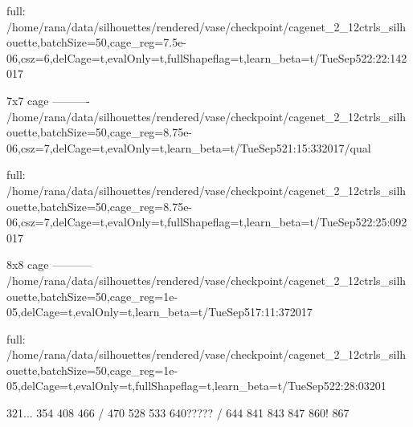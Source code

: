 \documentclass[acmtog,timestamp]{acmart}%
\begin{document}
full:
/home/rana/data/silhouettes/rendered/vase/checkpoint/cagenet_2_12ctrls_silhouette,batchSize=50,cage_reg=7.5e-06,csz=6,delCage=t,evalOnly=t,fullShapeflag=t,learn_beta=t/TueSep522:22:142017

7x7 cage
----------
/home/rana/data/silhouettes/rendered/vase/checkpoint/cagenet_2_12ctrls_silhouette,batchSize=50,cage_reg=8.75e-06,csz=7,delCage=t,evalOnly=t,learn_beta=t/TueSep521:15:332017/qual

full:
/home/rana/data/silhouettes/rendered/vase/checkpoint/cagenet_2_12ctrls_silhouette,batchSize=50,cage_reg=8.75e-06,csz=7,delCage=t,evalOnly=t,fullShapeflag=t,learn_beta=t/TueSep522:25:092017

8x8 cage
-----------
/home/rana/data/silhouettes/rendered/vase/checkpoint/cagenet_2_12ctrls_silhouette,batchSize=50,cage_reg=1e-05,delCage=t,evalOnly=t,learn_beta=t/TueSep517:11:372017

full:
/home/rana/data/silhouettes/rendered/vase/checkpoint/cagenet_2_12ctrls_silhouette,batchSize=50,cage_reg=1e-05,delCage=t,evalOnly=t,fullShapeflag=t,learn_beta=t/TueSep522:28:03201


321...
354
408
466 / 470
528
533
640????? / 644
841
843
847
860!
867
\end{document}
